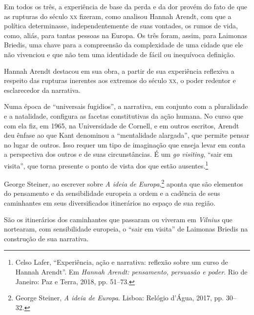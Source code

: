\begin{multicols}{2}
Em todos os três, a experiência de base da perda e da dor provém do fato
de que as rupturas do século \textsc{xx} fizeram, como analisou Hannah Arendt,
com que a política determinasse, independentemente de suas vontades, os
rumos de vida, como, aliás, para tantas pessoas na Europa. Os três foram, assim, 
para Laimonas Briedis, uma chave para a
compreensão da complexidade de uma cidade que ele não vivenciou e que
não tem uma identidade de fácil ou inequívoca definição.

Hannah Arendt destacou em sua obra, a partir de sua experiência
reflexiva a respeito das rupturas inerentes aos extremos do século \textsc{xx}, o
poder redentor e esclarecedor da narrativa.

Numa época de ``universais fugidios'', a narrativa, em conjunto com a
pluralidade e a natalidade, configura as facetas constitutivas da ação
humana. No curso que com ela fiz, em 1965, na Universidade de Cornell, e
em outros escritos, Arendt deu ênfase ao que Kant denominou a
``mentalidade alargada'', que permite pensar no lugar de outros. Isso
requer um tipo de imaginação que enseja levar em conta a perspectiva dos
outros e de suas circunstâncias. É um \textit{go visiting}, ``sair em
visita'', que torna presente o ponto de vista dos que estão
ausentes.\footnote{Celso Lafer, ``Experiência, ação e narrativa:
  reflexão sobre um curso de Hannah Arendt''. Em \textit{Hannah Arendt:
  pensamento, persuasão e poder}. Rio de Janeiro:
  Paz e Terra, 2018, pp. 51--73.}


George Steiner, ao escrever sobre \textit{A ideia de Europa},\footnote{George Steiner, 
\textit{A ideia de Europa}. Lisboa: Relógio d'Água, 
2017, pp. 30--32.} aponta que
são elementos do pensamento e da sensibilidade europeia a ordem e a
cadência de seus caminhantes em seus diversificados itinerários no
espaço de sua região.

São os itinerários dos caminhantes que passaram ou viveram em \textit{Vilnius}
que nortearam, com sensibilidade europeia, o ``sair em visita'' de
Laimonas Briedis na construção de sua narrativa.


\end{multicols}

